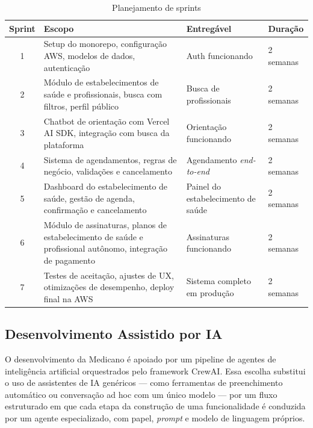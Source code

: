 \begin{table}[H]
  \centering
  \caption{Planejamento de sprints}
  \label{tab:sprints}
  \begin{tabular}{cp{6cm}p{3.5cm}p{2cm}}
    \toprule
    \textbf{Sprint} &
    \textbf{Escopo} &
    \textbf{Entregável} &
    \textbf{Duração} \\
    \midrule
    1 & Setup do monorepo, configuração AWS,
        modelos de dados, autenticação
      & Auth funcionando
      & 2 semanas \\
    \midrule
    2 & Módulo de estabelecimentos de saúde e profissionais,
        busca com filtros, perfil público
      & Busca de profissionais
      & 2 semanas \\
    \midrule
    3 & Chatbot de orientação com Vercel AI SDK,
        integração com busca da plataforma
      & Orientação funcionando
      & 2 semanas \\
    \midrule
    4 & Sistema de agendamentos, regras de
        negócio, validações e cancelamento
      & Agendamento \textit{end-to-end}
      & 2 semanas \\
    \midrule
    5 & Dashboard do estabelecimento de saúde, gestão de agenda,
        confirmação e cancelamento
      & Painel do estabelecimento de saúde
      & 2 semanas \\
    \midrule
    6 & Módulo de assinaturas, planos de estabelecimento de saúde
        e profissional autônomo, integração de
        pagamento
      & Assinaturas funcionando
      & 2 semanas \\
    \midrule
    7 & Testes de aceitação, ajustes de UX,
        otimizações de desempenho, deploy
        final na AWS
      & Sistema completo em produção
      & 2 semanas \\
    \bottomrule
  \end{tabular}
\end{table}

\subsection{Desenvolvimento Assistido por IA}
\label{subsec:ai-assisted-dev}

O desenvolvimento da Medicano é apoiado por um pipeline
de agentes de inteligência artificial orquestrados pelo
framework CrewAI. Essa escolha substitui o uso de
assistentes de IA genéricos --- como ferramentas de
preenchimento automático ou conversação ad hoc com um
único modelo --- por um fluxo estruturado em que cada
etapa da construção de uma funcionalidade é conduzida
por um agente especializado, com papel, \textit{prompt}
e modelo de linguagem próprios.

